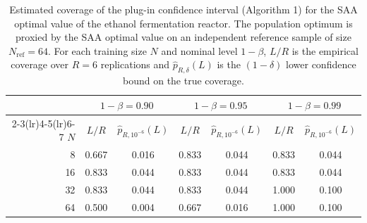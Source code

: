 \begin{table}[t]
  \centering
  \caption{Estimated coverage of the plug-in confidence interval (Algorithm 1) for the SAA optimal value of the ethanol fermentation reactor. The population optimum is proxied by the SAA optimal value on an independent reference sample of size $N_{\mathrm{ref}} = 64$. For each training size $N$ and nominal level $1-\beta$, $L/R$ is the empirical coverage over $R=6$ replications and $\widehat p_{R,\delta}(L)$ is the $(1-\delta)$ lower confidence bound on the true coverage.}
  \label{tab:coverage_plugin}
  \begin{tabular}{rcccccc}
    \toprule
     & \multicolumn{2}{c}{$1-\beta = 0.90$} & \multicolumn{2}{c}{$1-\beta = 0.95$} & \multicolumn{2}{c}{$1-\beta = 0.99$} \\
    \cmidrule(lr){2-3}\cmidrule(lr){4-5}\cmidrule(lr){6-7}
    $N$ & $L/R$ & $\widehat{p}_{R,10^{-6}}(L)$ & $L/R$ & $\widehat{p}_{R,10^{-6}}(L)$ & $L/R$ & $\widehat{p}_{R,10^{-6}}(L)$ \\
    \midrule
    8 & 0.667 & 0.016 & 0.833 & 0.044 & 0.833 & 0.044 \\
    16 & 0.833 & 0.044 & 0.833 & 0.044 & 0.833 & 0.044 \\
    32 & 0.833 & 0.044 & 0.833 & 0.044 & 1.000 & 0.100 \\
    64 & 0.500 & 0.004 & 0.667 & 0.016 & 1.000 & 0.100 \\
    \bottomrule
  \end{tabular}
\end{table}
